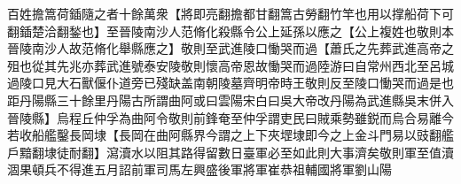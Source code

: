 百姓擔篙荷鍤隨之者十餘萬衆【將即亮翻擔都甘翻篙古勞翻竹竿也用以撑船荷下可翻鍤楚洽翻鍫也】至晉陵南沙人范脩化殺縣令公上延孫以應之【公上複姓也敬則本晉陵南沙人故范脩化舉縣應之】敬則至武進陵口慟哭而過【蕭氏之先葬武進高帝之殂也從其先兆亦葬武進號泰安陵敬則懷高帝恩故慟哭而過陸游曰自常州西北至呂城過陵口見大石獸偃仆道旁已殘缺盖南朝陵墓齊明帝時王敬則反至陵口慟哭而過是也距丹陽縣三十餘里丹陽古所謂曲阿或曰雲陽宋白曰吳大帝改丹陽為武進縣吳末併入晉陵縣】烏程丘仲孚為曲阿令敬則前鋒奄至仲孚謂吏民曰賊乘勢雖鋭而烏合易離今若收船艦鑿長岡埭【長岡在曲阿縣界今謂之上下夾堽埭即今之上金斗門易以豉翻艦戶黯翻埭徒耐翻】瀉瀆水以阻其路得留數日臺軍必至如此則大事濟矣敬則軍至值瀆涸果頓兵不得進五月詔前軍司馬左興盛後軍將軍崔恭祖輔國將軍劉山陽